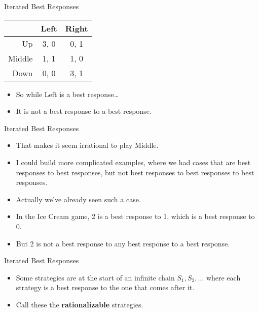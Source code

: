 \documentclass[
  ignorenonframetext,
]{beamer}
\providecommand{\tightlist}{%
  \setlength{\itemsep}{0pt}\setlength{\parskip}{0pt}}
\begin{document}
\begin{frame}{Iterated Best Responses}
\protect\hypertarget{iterated-best-responses}{}
\begin{table}[!h]
\centering
\begin{tabular}[t]{>{}r|cc}
\toprule
 & Left & Right\\
\midrule
Up & 3, 0 & 0, 1\\
Middle & 1, 1 & 1, 0\\
Down & 0, 0 & 3, 1\\
\bottomrule
\end{tabular}
\end{table}

\begin{itemize}
\tightlist
\item
  So while Left is a best response\ldots{}
\item
  It is not a best response to a best response.
\end{itemize}
\end{frame}

\begin{frame}{Iterated Best Responses}
\protect\hypertarget{iterated-best-responses-1}{}
\begin{itemize}
\tightlist
\item
  That makes it seem irrational to play Middle. \pause
\item
  I could build more complicated examples, where we had cases that are
  best responses to best responses, but not best responses to best
  responses to best responses. \pause
\item
  Actually we've already seen such a case.
\item
  In the Ice Cream game, 2 is a best response to 1, which is a best
  response to 0.
\item
  But 2 is not a best response to any best response to a best response.
\end{itemize}
\end{frame}

\begin{frame}{Iterated Best Responses}
\protect\hypertarget{iterated-best-responses-2}{}
\begin{itemize}
\tightlist
\item
  Some strategies are at the start of an infinite chain
  \(S_1, S_2, \dots\) where each strategy is a best response to the one
  that comes after it.
\item
  Call these the \textbf{rationalizable} strategies.
\end{itemize}
\end{frame}
\end{document}
